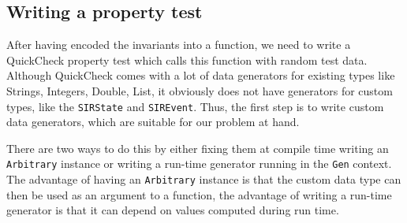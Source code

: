 %
%

\subsection{Writing a property test}
After having encoded the invariants into a function, we need to write a QuickCheck property test which calls this function with random test data. Although QuickCheck comes with a lot of data generators for existing types like Strings, Integers, Double, List, it obviously does not have generators for custom types, like the \texttt{SIRState} and \texttt{SIREvent}. Thus, the first step is to write custom data generators, which are suitable for our problem at hand.

There are two ways to do this by either fixing them at compile time writing an \texttt{Arbitrary} instance or writing a run-time generator running in the \texttt{Gen} context. The advantage of having an \texttt{Arbitrary} instance is that the custom data type can then be used as an argument to a function, the advantage of writing a run-time generator is that it can depend on values computed during run time.

